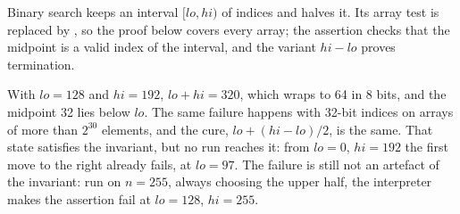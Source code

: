 \begin{omfigure}
\par{}
\end{omfigure}

Binary search keeps an interval $[lo, hi)$ of indices and halves it. Its array test is replaced by , so the proof below covers every array; the assertion checks that the midpoint is a valid index of the interval, and the variant $hi - lo$ proves termination.

\label{lst:b3:program-verification:bsearch}

\label{out:b3:program-verification:bsearch}

With $lo = 128$ and $hi = 192$, $lo + hi = 320$, which wraps to 64 in 8 bits, and the midpoint 32 lies below $lo$. The same failure happens with 32-bit indices on arrays of more than $2^{30}$ elements, and the cure, $lo + (hi - lo)/2$, is the same. %
That state satisfies the invariant, but no run reaches it: from $lo = 0$, $hi = 192$ the first move to the right already fails, at $lo = 97$. The failure is still not an artefact of the invariant: run on $n = 255$, always choosing the upper half, the interpreter makes the assertion fail at $lo = 128$, $hi = 255$.


